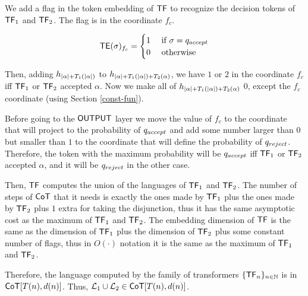 We add a flag in the token embedding of $\mathsf{TF}$ to recognize the decision tokens of ${\mathsf{TF}}_1$ and ${\mathsf{TF}}_2$.
The flag is in the coordinate $f_c$.

\[
    \mathsf{TE}(\sigma)_{f_c} = \begin{cases}
        1 & \text{ if } \sigma = q_{accept} \\
        0 & \text{ otherwise } \\
    \end{cases}
\]

Then, adding $h_{|\alpha| + {T}_1(|\alpha|)}$ to $h_{|\alpha| + {T}_1(|\alpha|) + {T}_2(\alpha)}$, we have $1$ or $2$ in the coordinate $f_c$ iff ${\mathsf{TF}}_1$ or ${\mathsf{TF}}_2$ accepted $\alpha$.
Now we make all of $h_{|\alpha| + {T}_1(|\alpha|) + {T}_2(\alpha)}$ $0$, except the $f_c$ coordinate (using Section \ref{const-fun}).

Before going to the $\mathsf{OUTPUT}$ layer we move the value of $f_c$ to the coordinate that will project to the probability of $q_{accept}$ and add some number larger than $0$ but smaller than $1$ to the coordinate that will define the probability of $q_{reject}$.
Therefore, the token with the maximum probability will be $q_{accept}$ iff ${\mathsf{TF}}_1$ or ${\mathsf{TF}}_2$ accepted $\alpha$, and it will be $q_{reject}$ in the other case.

Then, $\mathsf{TF}$ computes the union of the languages of ${\mathsf{TF}}_1$ and ${\mathsf{TF}}_2$.
The number of steps of $\mathsf{CoT}$ that it needs is exactly the ones made by ${\mathsf{TF}}_1$ plus the ones made by ${\mathsf{TF}}_2$ plus $1$ extra for taking the disjunction, thus it has the same asymptotic cost as the maximum of ${\mathsf{TF}}_1$ and ${\mathsf{TF}}_2$.
The embedding dimension of $\mathsf{TF}$ is the same as the dimension of ${\mathsf{TF}}_1$ plus the dimension of ${\mathsf{TF}}_2$ plus some constant number of flags, thus in $O(\cdot)$ notation it is the same as the maximum of ${\mathsf{TF}}_1$ and ${\mathsf{TF}}_2$.

Therefore, the language computed by the family of transformers $\{\mathsf{TF}_n\}_{n \in \mathbb{N}}$ is in $\mathsf{CoT}[T(n), d(n)]$.
Thus, $\mathcal{L}_1 \cup \mathcal{L}_2 \in \mathsf{CoT}[T(n), d(n)]$.

